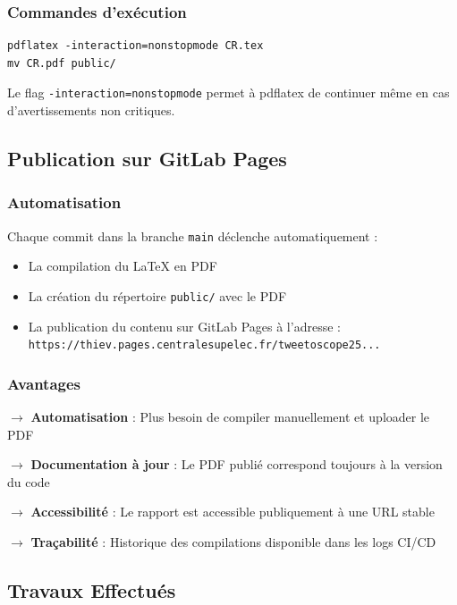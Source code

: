 \documentclass[10pt,a4paper]{article}
\begin{document}
\subsubsection{Commandes d'exécution}

\begin{verbatim}
pdflatex -interaction=nonstopmode CR.tex
mv CR.pdf public/
\end{verbatim}

Le flag \texttt{-interaction=nonstopmode} permet à pdflatex de continuer même en cas d'avertissements non critiques.

\subsection{Publication sur GitLab Pages}

\subsubsection{Automatisation}

Chaque commit dans la branche \texttt{main} déclenche automatiquement :

\begin{itemize}
    \item La compilation du LaTeX en PDF
    \item La création du répertoire \texttt{public/} avec le PDF
    \item La publication du contenu sur GitLab Pages à l'adresse : \texttt{https://thiev.pages.centralesupelec.fr/tweetoscope25...}
\end{itemize}

\subsubsection{Avantages}

$\rightarrow$ \textbf{Automatisation} : Plus besoin de compiler manuellement et uploader le PDF

$\rightarrow$ \textbf{Documentation à jour} : Le PDF publié correspond toujours à la version du code

$\rightarrow$ \textbf{Accessibilité} : Le rapport est accessible publiquement à une URL stable

$\rightarrow$ \textbf{Traçabilité} : Historique des compilations disponible dans les logs CI/CD

\subsection{Travaux Effectués}
\end{document}
